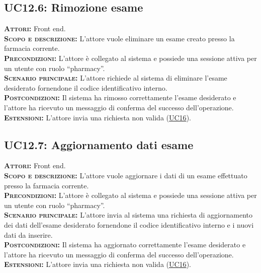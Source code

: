 \subsection{UC12.6: Rimozione esame}
\label{sec:UC126}
\textsc{\textbf{Attori:}} Front end.\\
\textsc{\textbf{Scopo e descrizione:}} L'attore vuole eliminare un esame creato presso la farmacia corrente.\\
\textsc{\textsc{\textbf{Precondizioni:}}} L'attore è collegato al sistema e possiede una sessione attiva per un utente con ruolo ``pharmacy''.\\
\textsc{\textbf{Scenario principale:}} L'attore richiede al sistema di eliminare l'esame desiderato fornendone il codice identificativo interno.\\
\textsc{\textbf{Postcondizioni:}} Il sistema ha rimosso correttamente l'esame desiderato e l'attore ha ricevuto un messaggio di conferma del successo dell'operazione.\\
\textsc{\textbf{Estensioni:}} L'attore invia una richiesta non valida (\hyperref[sec:UC16]{UC16}).

\subsection{UC12.7: Aggiornamento dati esame}
\label{sec:UC127}
\textsc{\textbf{Attori:}} Front end.\\
\textsc{\textbf{Scopo e descrizione:}} L'attore vuole aggiornare i dati di un esame effettuato presso la farmacia corrente.\\
\textsc{\textsc{\textbf{Precondizioni:}}} L'attore è collegato al sistema e possiede una sessione attiva per un utente con ruolo ``pharmacy''.\\
\textsc{\textbf{Scenario principale:}} L'attore invia al sistema una richiesta di aggiornamento dei dati dell'esame desiderato fornendone il codice identificativo interno e i nuovi dati da inserire.\\
\textsc{\textbf{Postcondizioni:}} Il sistema ha aggiornato correttamente l'esame desiderato e l'attore ha ricevuto un messaggio di conferma del successo dell'operazione.\\
\textsc{\textbf{Estensioni:}} L'attore invia una richiesta non valida (\hyperref[sec:UC16]{UC16}).

